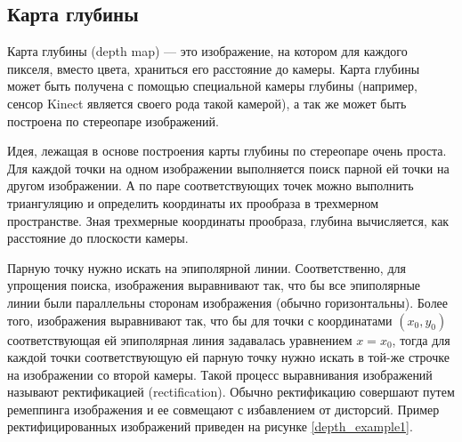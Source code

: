 \subsection{Карта глубины}
Карта глубины (depth map) — это изображение, на котором для каждого пикселя, вместо цвета, храниться его расстояние до камеры. Карта глубины может быть получена с помощью специальной камеры глубины (например, сенсор Kinect является своего рода такой камерой), а так же может быть построена по стереопаре изображений.

Идея, лежащая в основе построения карты глубины по стереопаре очень проста. Для каждой точки на одном изображении выполняется поиск парной ей точки на другом изображении. А по паре соответствующих точек можно выполнить триангуляцию и определить координаты их прообраза в трехмерном пространстве. Зная трехмерные координаты прообраза, глубина вычисляется, как расстояние до плоскости камеры.

Парную точку нужно искать на эпиполярной линии. Соответственно, для упрощения поиска, изображения выравнивают так, что бы все эпиполярные линии были параллельны сторонам изображения (обычно горизонтальны). Более того, изображения выравнивают так, что бы для точки с координатами $(x_0, y_0)$ соответствующая ей эпиполярная линия задавалась уравнением $x = x_0$, тогда для каждой точки соответствующую ей парную точку нужно искать в той-же строчке на изображении со второй камеры. Такой процесс выравнивания изображений называют ректификацией (rectification). Обычно ректификацию совершают путем ремеппинга изображения и ее совмещают с избавлением от дисторсий. Пример ректифицированных изображений приведен на рисунке \ref{depth_example1}.

